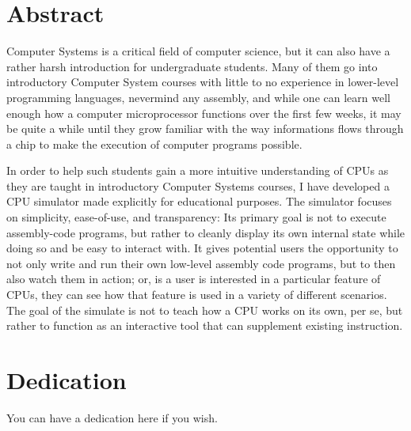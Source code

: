 \documentclass[12pt,twoside]{reedthesis}
\begin{document}
\tableofcontents
\listoftables
\listoffigures

\chapter*{Abstract}
Computer Systems is a critical field of computer science, but it can also have a rather harsh introduction for undergraduate students. Many of them go into introductory Computer System courses with little to no experience in lower-level programming languages, nevermind any assembly, and while one can learn well enough how a computer microprocessor functions over the first few weeks, it may be quite a while until they grow familiar with the way informations flows through a chip to make the execution of computer programs possible.

In order to help such students gain a more intuitive understanding of CPUs as they are taught in introductory Computer Systems courses, I have developed a CPU simulator made explicitly for educational purposes. The simulator focuses on simplicity, ease-of-use, and transparency: Its primary goal is not to execute assembly-code programs, but rather to cleanly display its own internal state while doing so and be easy to interact with. It gives potential users the opportunity to not only write and run their own low-level assembly code programs, but to then also watch them in action; or, is a user is interested in a particular feature of CPUs, they can see how that feature is used in a variety of different scenarios. The goal of the simulate is not to teach how a CPU works on its own, per se, but rather to function as an interactive tool that can supplement existing instruction.

\chapter*{Dedication}
You can have a dedication here if you wish.

\mainmatter %
\pagestyle{fancyplain} %

\end{document}
